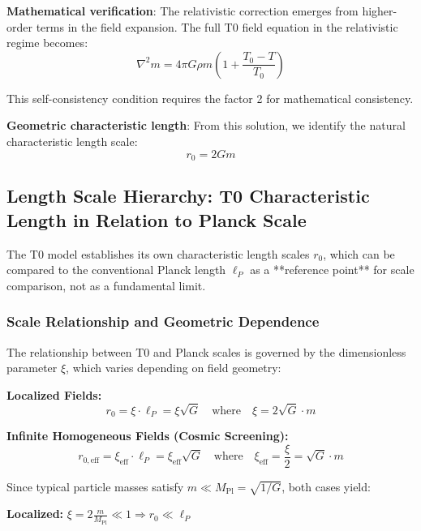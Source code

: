 \documentclass[12pt,a4paper]{article}
\begin{document}
\textbf{Mathematical verification}:
The relativistic correction emerges from higher-order terms in the field expansion. The full T0 field equation in the relativistic regime becomes:
\begin{equation}
	\nabla^2 m = 4\pi G \rho m \left(1 + \frac{T_0 - T}{T_0}\right)
\end{equation}

This self-consistency condition requires the factor 2 for mathematical consistency.

\textbf{Geometric characteristic length}: From this solution, we identify the natural characteristic length scale:
\begin{equation}
	\boxed{r_0 = 2Gm}
\end{equation}
\subsection{Length Scale Hierarchy: T0 Characteristic Length in Relation to Planck Scale}
\label{subsec:planck_comparison}

The T0 model establishes its own characteristic length scales $r_0$, which can be compared to the conventional Planck length $\ell_P$ as a **reference point** for scale comparison, not as a fundamental limit.

\subsubsection{Scale Relationship and Geometric Dependence}
\label{subsubsec:scale_relationship}

The relationship between T0 and Planck scales is governed by the dimensionless parameter $\xi$, which varies depending on field geometry:

\textbf{Localized Fields:}
\begin{equation}
	r_0 = \xi \cdot \ell_P = \xi \sqrt{G} \quad \text{where} \quad \xi = 2\sqrt{G} \cdot m
\end{equation}

\textbf{Infinite Homogeneous Fields (Cosmic Screening):}
\begin{equation}
	r_{0,\text{eff}} = \xi_{\text{eff}} \cdot \ell_P = \xi_{\text{eff}} \sqrt{G} \quad \text{where} \quad \xi_{\text{eff}} = \frac{\xi}{2} = \sqrt{G} \cdot m
\end{equation}

Since typical particle masses satisfy $m \ll M_{\text{Pl}} = \sqrt{1/G}$, both cases yield:

\textbf{Localized:} $\xi = 2\frac{m}{M_{\text{Pl}}} \ll 1 \Rightarrow r_0 \ll \ell_P$
\end{document}
